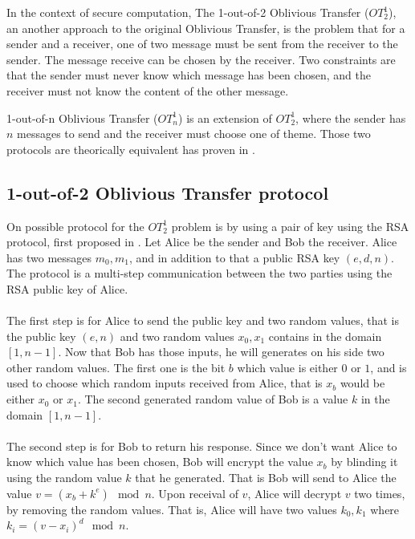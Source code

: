 \documentclass[11pt,a4paper]{article}
\begin{document}
In the context of secure computation,
The 1-out-of-2 Oblivious Transfer ($OT^1_2$),
an another approach to the original Oblivious Transfer, is the problem
that for a sender and a receiver, one of two message must be sent
from the receiver to the sender. The message receive can be chosen
by the receiver. Two constraints are that the sender must never know
which message has been chosen, and the receiver must not know
the content of the other message.

1-out-of-n Oblivious Transfer ($OT^1_n$) is an extension of $OT^1_2$,
where the sender has $n$ messages to send and the receiver must choose
one of theme. Those two protocols are theorically equivalent
has proven in \cite{goos_equivalence_1988, goos_foundations_1998}.


\subsection{1-out-of-2 Oblivious Transfer protocol}

On possible protocol for the $OT^1_2$ problem is by using a pair of
key using the RSA protocol, first proposed in \cite{even_randomized_1985}.
Let Alice be the sender and Bob the receiver.
Alice has two messages $m_0,m_1$, and in addition to that
a public RSA key $(e, d, n)$. The protocol is a multi-step
communication between the two parties using the RSA public key
of Alice.

\paragraph{}

The first step is for Alice
to send the public key and two random values, that is
the public key $(e, n)$ and two random values $x_0, x_1$
contains in the domain $[1, n-1]$. Now that Bob has those inputs,
he will generates on his side two other random values.
The first one is the bit $b$ which value is either $0$ or $1$,
and is used to choose which random inputs received from Alice,
that is $x_b$ would be either $x_0$ or $x_1$. The second
generated random value of Bob is a value $k$ in the domain
$[1, n-1]$.

\paragraph{}


The second step is for Bob to return his response. Since
we don't want Alice to know which value has been chosen, Bob
will encrypt the value $x_b$ by blinding it using the random value $k$
that he generated. That is Bob will send to Alice
the value $v = (x_b + k^e) \mod n$.
Upon receival of $v$, Alice will decrypt $v$ two times, by removing
the random values. That is, Alice will have two values $k_0, k_1$
where $k_i = (v - x_i)^d \mod n$.
\end{document}
